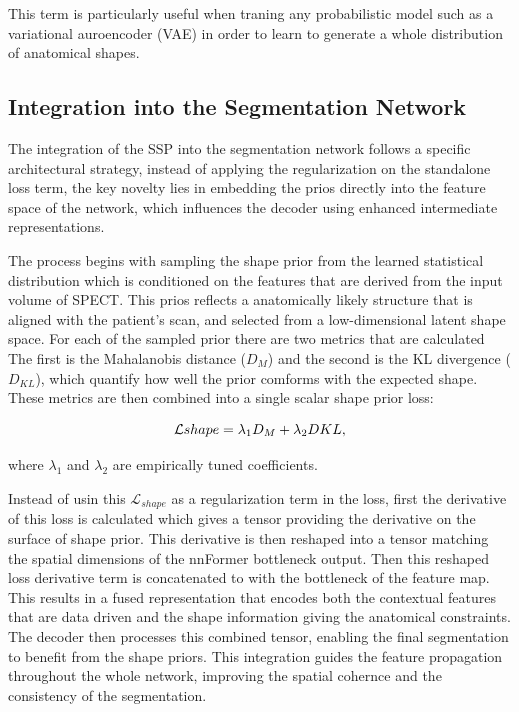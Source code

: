 This term is particularly useful when traning any probabilistic model such as a variational auroencoder (VAE) in order to learn to generate a whole distribution of anatomical shapes.

\subsection{Integration into the Segmentation Network}
The integration of the SSP into the segmentation network follows a specific architectural strategy, instead of applying the regularization on the standalone loss term, the key novelty lies in embedding the prios directly into the feature space of the network, which influences the decoder using enhanced intermediate representations. 

The process begins with sampling the shape prior from the learned statistical distribution which is conditioned on the features that are derived from the input volume of SPECT. This prios reflects a anatomically likely structure that is aligned with the patient's scan, and selected from a low-dimensional latent shape space. For each of the sampled prior there are two metrics that are calculated The first is the Mahalanobis distance ($D_M$) and the second is the KL divergence ($D_{KL}$), which quantify how well the prior comforms with the expected shape. These metrics are then combined into a single scalar shape prior loss:

\begin{equation}
\addcontentsline{equ}{equations}{\protect\numberline{\theequation}Combined Shape Loss} 
    \mathcal{L}{shape} = \lambda_1 D_M + \lambda_2 D{KL}, 
\end{equation}

where $\lambda_1$ and $\lambda_2$ are empirically tuned coefficients.

Instead of usin this $\mathcal{L}_{shape}$ as a regularization term in the loss, first the derivative of this loss is calculated which gives a tensor providing the derivative on the surface of shape prior. This derivative is then reshaped into a tensor matching the spatial dimensions of the nnFormer bottleneck output. Then this reshaped loss derivative term is concatenated to with the bottleneck of the feature map. This results in a fused representation that encodes both the contextual features that are data driven and the shape information giving the anatomical constraints. The decoder then processes this combined tensor, enabling the final segmentation to benefit from the shape priors. This integration guides the feature propagation throughout the whole network, improving the spatial cohernce and the consistency of the segmentation.


